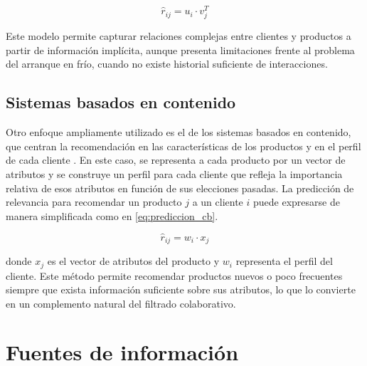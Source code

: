 \begin{equation}
\label{eq:prediccion_cf}
\hat{r}_{ij} = u_i \cdot v_j^T
\end{equation}

Este modelo permite capturar relaciones complejas entre clientes y productos a partir de información implícita, aunque presenta limitaciones frente al problema del arranque en frío, cuando no existe historial suficiente de interacciones.

\subsection{Sistemas basados en contenido}

Otro enfoque ampliamente utilizado es el de los sistemas basados en contenido, que centran la recomendación en las características de los productos y en el perfil de cada cliente \cite{ARTICLE:Pazzani2007}. En este caso, se representa a cada producto por un vector de atributos y se construye un perfil para cada cliente que refleja la importancia relativa de esos atributos en función de sus elecciones pasadas. La predicción de relevancia para recomendar un producto $j$ a un cliente $i$ puede expresarse de manera simplificada como en \ref{eq:prediccion_cb}.

\begin{equation}
\label{eq:prediccion_cb}
\hat{r}_{ij} = w_i \cdot x_j
\end{equation}

donde $x_j$ es el vector de atributos del producto y $w_i$ representa el perfil del cliente. Este método permite recomendar productos nuevos o poco frecuentes siempre que exista información suficiente sobre sus atributos, lo que lo convierte en un complemento natural del filtrado colaborativo.


\section{Fuentes de información}



